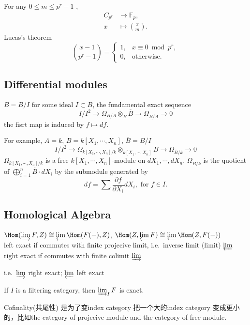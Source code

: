 For any $0\leq m \leq p^r-1$ ,
\begin{align*}
C_{p^r} &\longrightarrow \mathbb{F}_p, \\
x &\mapsto \binom{x}{m}.
\end{align*}
Lucas's theorem 
\[ \binom{x-1}{p^r-1}=\begin{cases}
 	1,& x \equiv 0 \bmod  p^r, \\
 	0,& \mbox{otherwise.}
 \end{cases}\]

\subsection{Differential modules}
$\overline{B}=B/I$ for some ideal $I\subset B$, the fundamental exact sequence
\[I/I^2\longrightarrow \Omega_{B/A}\otimes_B \overline{B} \longrightarrow \Omega_{\overline{B}/A}\longrightarrow 0\]
the fisrt map is induced by $f\mapsto df$.

For example, $A=k$, $B=k[X_1,\cdots,X_n]$, $\overline{B}=B/I$
\[I/I^2\longrightarrow \Omega_{k[X_1,\cdots,X_n]/k}\otimes_{k[X_1,\cdots,X_n]} \overline{B} \longrightarrow \Omega_{\overline{B}/k}\longrightarrow 0\]
$\Omega_{k[X_1,\cdots,X_n]/k}$ is a free $k[X_1,\cdots,X_n]$-module on $dX_1,\cdots,dX_n$. $\Omega_{\overline{B}/k}$ is the quotient of $\bigoplus_{i=1}^n \overline{B}\cdot dX_i$ by the submodule generated by 
\[df=\sum \frac{\partial f}{\partial X_i}dX_i, \text{ for $f\in I.$}\]

\subsection{Homological Algebra}
$\Hom(\varinjlim F,Z)\cong \varprojlim \Hom(F(-),Z)$, $\Hom(Z,\varprojlim F)\cong \varprojlim \Hom(Z,F(-))$\\
left exact if commutes with finite projecive limit, i.e.\ inverse limit (limit) $\varprojlim$\\
right exact if commutes with finite colimit $\varinjlim$

i.e.\ $\varinjlim$ right exact; $\varprojlim$ left exact

If $I$ is a filtering category, then $\varinjlim_I F$ is exact.

Cofinality(共尾性) 是为了变index category 把一个大的index category 变成更小的，比如the category of projecive module and the category of free module.